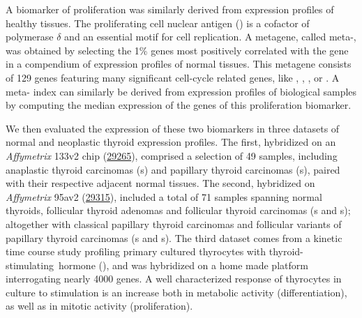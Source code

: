 A biomarker of proliferation was similarly derived from expression profiles of
healthy tissues.  The proliferating cell nuclear antigen () is a
cofactor of  polymerase $\delta$ and an essential motif for cell
replication.  A metagene, called meta-, was obtained by
selecting the 1\% genes most positively correlated with the
 gene in a compendium of expression profiles of normal
tissues.\cite{venet_most_2011} This metagene consists of 129 genes featuring
many significant cell-cycle related genes, like ,
, , or .
A meta- index can similarly be derived from expression profiles
of biological samples by computing the median expression of the genes of this
proliferation biomarker.


We then evaluated the expression of these two biomarkers in three datasets of
normal and neoplastic thyroid expression profiles.  The first, hybridized on an
\emph{Affymetrix} 133v2 chip
(\href{http://www.ncbi.nlm.nih.gov/geo/query/acc.cgi?acc=GSE29265}{29265}),
comprised a selection of 49 samples, including anaplastic thyroid carcinomas
(s) and papillary thyroid carcinomas (s), paired
with their respective adjacent normal tissues.  The second, hybridized on
\emph{Affymetrix} 95av2
(\href{http://www.ncbi.nlm.nih.gov/geo/query/acc.cgi?acc=GSE29315}{29315}),
included a total of 71 samples spanning normal thyroids, follicular thyroid
adenomas and follicular thyroid carcinomas (s and
s); altogether with classical papillary thyroid carcinomas and
follicular variants of papillary thyroid carcinomas (s and
s).  The third dataset\cite{van_staveren_gene_2006} comes from
a kinetic time course study profiling primary cultured thyrocytes with
\mbox{thyroid-stimulating hormone} (), and was hybridized on a
home made platform interrogating nearly \num{4000} genes.  A well characterized
response of thyrocytes in culture to  stimulation is an increase
both in metabolic activity (differentiation), as well as in mitotic activity
(proliferation).

